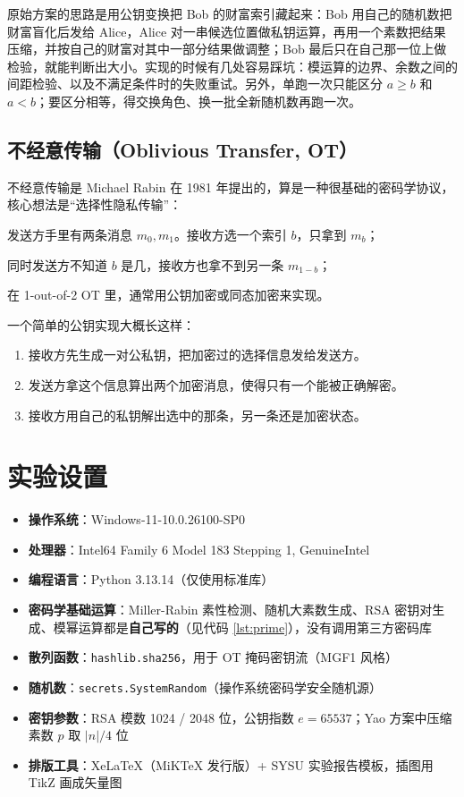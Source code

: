 \documentclass{SYSUReport}
\begin{document}
原始方案的思路是用公钥变换把 Bob 的财富索引藏起来：Bob 用自己的随机数把财富盲化后发给 Alice，Alice 对一串候选位置做私钥运算，再用一个素数把结果压缩，并按自己的财富对其中一部分结果做调整；Bob 最后只在自己那一位上做检验，就能判断出大小。实现的时候有几处容易踩坑：模运算的边界、余数之间的间距检验、以及不满足条件时的失败重试。另外，单跑一次只能区分 \(a \ge b\) 和 \(a < b\)；要区分相等，得交换角色、换一批全新随机数再跑一次。

\subsection{不经意传输（Oblivious Transfer, OT）}

不经意传输是 Michael Rabin 在 1981 年提出的，算是一种很基础的密码学协议，核心想法是“选择性隐私传输”：

发送方手里有两条消息 \(m_0, m_1\)。接收方选一个索引 \(b\)，只拿到 \(m_b\)；

同时发送方不知道 \(b\) 是几，接收方也拿不到另一条 \(m_{1-b}\)；

在 1-out-of-2 OT 里，通常用公钥加密或同态加密来实现。

一个简单的公钥实现大概长这样：

\begin{enumerate}
    \item 接收方先生成一对公私钥，把加密过的选择信息发给发送方。
    \item 发送方拿这个信息算出两个加密消息，使得只有一个能被正确解密。
    \item 接收方用自己的私钥解出选中的那条，另一条还是加密状态。
\end{enumerate}

\section{实验设置}

\begin{itemize}
    \item \textbf{操作系统}：Windows-11-10.0.26100-SP0
    \item \textbf{处理器}：Intel64 Family 6 Model 183 Stepping 1, GenuineIntel
    \item \textbf{编程语言}：Python 3.13.14（仅使用标准库）
    \item \textbf{密码学基础运算}：Miller-Rabin 素性检测、随机大素数生成、RSA 密钥对生成、模幂运算都是\textbf{自己写的}（见代码 \ref{lst:prime}），没有调用第三方密码库
    \item \textbf{散列函数}：\texttt{hashlib.sha256}，用于 OT 掩码密钥流（MGF1 风格）
    \item \textbf{随机数}：\texttt{secrets.SystemRandom}（操作系统密码学安全随机源）
    \item \textbf{密钥参数}：RSA 模数 1024 / 2048 位，公钥指数 $e=65537$；Yao 方案中压缩素数 $p$ 取 $|n|/4$ 位
    \item \textbf{排版工具}：XeLaTeX（MiKTeX 发行版）+ SYSU 实验报告模板，插图用 TikZ 画成矢量图
\end{itemize}
\end{document}
